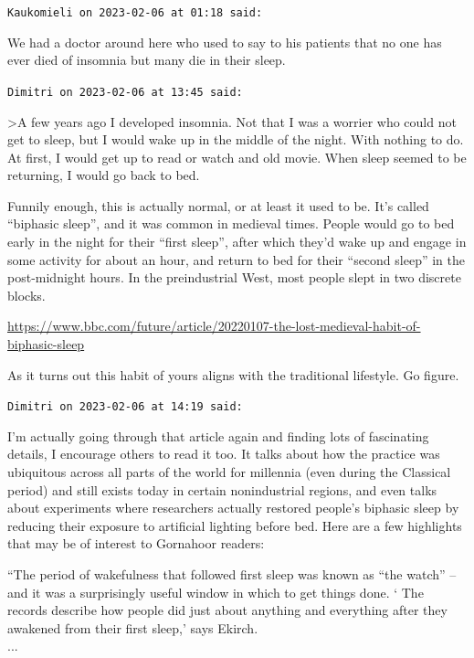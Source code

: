 \begin{footnotesize}
\begin{sffamily}
\texttt{Kaukomieli on 2023-02-06 at 01:18 said:}

We had a doctor around here who used to say to his patients that no one has ever died of insomnia but many die in their sleep.

\hfill

\texttt{Dimitri on 2023-02-06 at 13:45 said:}

\textgreater A few years ago I developed insomnia. Not that I was a worrier who could not get to sleep, but I would wake up in the middle of the night. With nothing to do. At first, I would get up to read or watch and old movie. When sleep seemed to be returning, I would go back to bed.

Funnily enough, this is actually normal, or at least it used to be. It's called ``biphasic sleep'', and it was common in medieval times. People would go to bed early in the night for their ``first sleep'', after which they'd wake up and engage in some activity for about an hour, and return to bed for their ``second sleep'' in the post-midnight hours. In the preindustrial West, most people slept in two discrete blocks.

\url{https://www.bbc.com/future/article/20220107-the-lost-medieval-habit-of-biphasic-sleep}


As it turns out this habit of yours aligns with the traditional lifestyle. Go figure.

\hfill

\texttt{Dimitri on 2023-02-06 at 14:19 said:}

I'm actually going through that article again and finding lots of fascinating details, I encourage others to read it too. It talks about how the practice was ubiquitous across all parts of the world for millennia (even during the Classical period) and still exists today in certain nonindustrial regions, and even talks about experiments where researchers actually restored people's biphasic sleep by reducing their exposure to artificial lighting before bed. Here are a few highlights that may be of interest to Gornahoor readers:

``The period of wakefulness that followed first sleep was known as ``the watch'' -- and it was a surprisingly useful window in which to get things done. ` The records describe how people did just about anything and everything after they awakened from their first sleep,' says Ekirch.\\
... \\


\end{sffamily}
\end{footnotesize}
